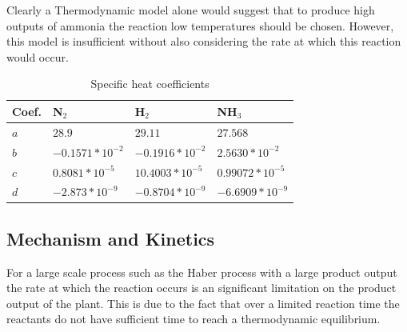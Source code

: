 \documentclass[11pt, a4paper]{article}
\begin{document}
{Clearly a Thermodynamic model alone would suggest that to produce high outputs of ammonia the reaction low temperatures should be chosen. However, this model is insufficient without also considering the rate at which this reaction would occur. 
\begin{table}[!htbp]
	\caption{Specific heat coefficients \cite{Morgan2013} \label{tab:cpco}}
	
	\begin{center}
		\begin{tabular}{|l|l|l|l|}
			\hline
			Coef. & 
			N$_2$               & H$_2$               & NH$_3$              \\
			\hline
			$a$           & $28.9$               & $29.11$              & $27.568$             \\
			\hline
			$b$           & $-0.1571*10^{-2}$ & $-0.1916*10^{-2}$ & $2.5630*10^{-2}$  \\ \hline
			$c$           & $0.8081*10^{-5}$  & $10.4003*10^{-5}$  & $0.99072*10^{-5}$ \\
			\hline
			$d$           & $-2.873*10^{-9}$  & $-0.8704*10^{-9}$ & $-6.6909*10^{-9}$ \\
			\hline
		\end{tabular}
		
	\end{center}
\end{table}

\subsection{Mechanism and Kinetics}

For a large scale process such as the Haber process with a large product output the rate at which the reaction occurs is an significant limitation on the product output of the plant. This is due to the fact that over a limited reaction time the reactants do not have sufficient time to reach a thermodynamic equilibrium.

}
\end{document}
